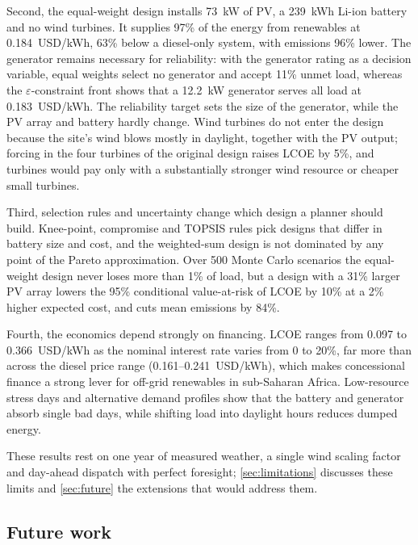 \documentclass[final,3p,times]{elsarticle}
\begin{document}
Second, the equal-weight design installs 73~kW of PV, a 239~kWh Li-ion battery and no wind turbines. It supplies 97\% of the energy from renewables at 0.184~USD/kWh, 63\% below a diesel-only system, with emissions 96\% lower. The generator remains necessary for reliability: with the generator rating as a decision variable, equal weights select no generator and accept 11\% unmet load, whereas the $\varepsilon$-constraint front shows that a 12.2~kW generator serves all load at 0.183~USD/kWh. The reliability target sets the size of the generator, while the PV array and battery hardly change. Wind turbines do not enter the design because the site's wind blows mostly in daylight, together with the PV output; forcing in the four turbines of the original design raises LCOE by 5\%, and turbines would pay only with a substantially stronger wind resource or cheaper small turbines.

Third, selection rules and uncertainty change which design a planner should build. Knee-point, compromise and TOPSIS rules pick designs that differ in battery size and cost, and the weighted-sum design is not dominated by any point of the Pareto approximation. Over 500 Monte Carlo scenarios the equal-weight design never loses more than 1\% of load, but a design with a 31\% larger PV array lowers the 95\% conditional value-at-risk of LCOE by 10\% at a 2\% higher expected cost, and cuts mean emissions by 84\%.

Fourth, the economics depend strongly on financing. LCOE ranges from 0.097 to 0.366~USD/kWh as the nominal interest rate varies from 0 to 20\%, far more than across the diesel price range (0.161--0.241~USD/kWh), which makes concessional finance a strong lever for off-grid renewables in sub-Saharan Africa. Low-resource stress days and alternative demand profiles show that the battery and generator absorb single bad days, while shifting load into daylight hours reduces dumped energy.

These results rest on one year of measured weather, a single wind scaling factor and day-ahead dispatch with perfect foresight; \cref{sec:limitations} discusses these limits and \cref{sec:future} the extensions that would address them.

\subsection{Future work \label{sec:future}}
\end{document}
